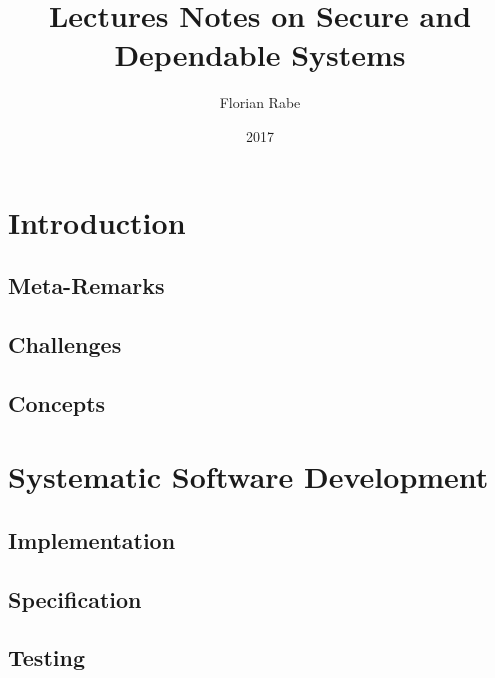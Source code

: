 \documentclass{book}
\title{Lectures Notes on Secure and Dependable Systems}
\author{Florian Rabe}
\date{2017}
\begin{document}
\maketitle

\tableofcontents
\newpage

\part{Introduction}

 \chapter{Meta-Remarks}
  

 \chapter{Challenges}
   

  \chapter{Concepts}
   

\part{Systematic Software Development}

  \chapter{Implementation}
    
     
  \chapter{Specification}
    

  \chapter{Testing}
    
\end{document}
